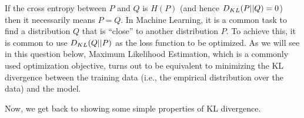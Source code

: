 If the cross entropy between $P$ and $Q$ is $H(P)$ (and hence $D_{KL}(P||Q) = 0$) then it necessarily
means $P = Q$. In Machine Learning, it is a common task to find a distribution $Q$ that is ``close'' to
another distribution $P$. To achieve this, it is common to use $D_{KL}(Q||P)$ as the loss function to be optimized.
As we will see in this question below, Maximum Likelihood Estimation, which is a commonly used
optimization objective, turns out to be equivalent to minimizing the KL divergence between the training data
(i.e., the empirical distribution over the data)
and the model.

Now, we get back to showing some simple properties of KL divergence.

\begin{enumerate}

  
\ifnum{} {
  
} \fi

  
\ifnum{} {
  
} \fi

  

\ifnum{} {
  
} \fi

\end{enumerate}

